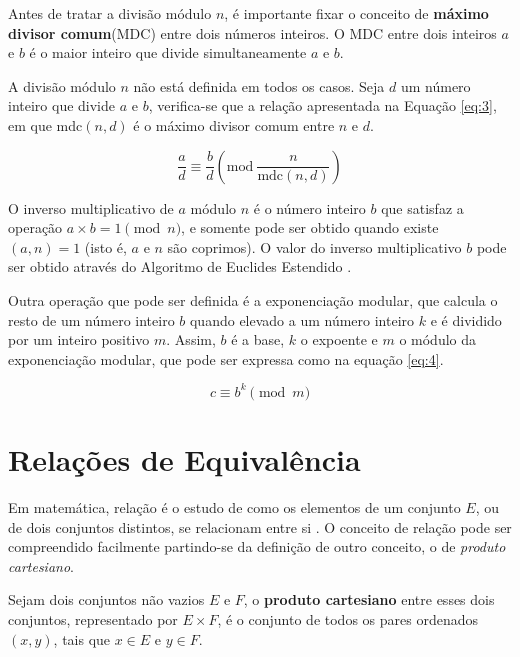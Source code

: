Antes de tratar a divisão módulo \(n\), é importante fixar o conceito de \textbf{máximo divisor comum}(MDC) entre dois números inteiros. O MDC entre dois inteiros \(a\) e \(b\) 
é o maior inteiro que divide simultaneamente \(a\) e \(b\).

A divisão módulo $n$ não está definida em todos os casos. Seja \(d\) um número inteiro que divide \(a\) e \(b\), verifica-se que a relação apresentada na Equação \ref{eq:3}, em que mdc\((n, d)\) é o máximo divisor comum entre \(n\) e \(d\).

\begin{equation}
  \frac{a}{d} \equiv \frac{b}{d}\left(\mbox{mod}\ \frac{n}{\text{mdc}(n,d)}\right) \label{eq:3}
\end{equation}

O inverso multiplicativo de $a$ módulo \(n\) é o número inteiro \(b\) que satisfaz a operação \(a \times b = 1 \pmod  n\), e somente pode ser obtido quando existe \((a, n) = 1\) (isto é, \(a\) e \(n\) são coprimos). O valor do inverso multiplicativo \(b\) pode ser obtido através do Algoritmo de Euclides Estendido \cite{Halim:2013}.

\par Outra operação que pode ser definida é a exponenciação modular, que calcula o resto de um número inteiro \(b\) quando elevado a um número inteiro \(k\) e é dividido por um inteiro positivo \(m\). Assim, $b$ é a base, $k$ o expoente e $m$ o módulo da exponenciação modular, que pode ser expressa como na equação \ref{eq:4}.

\begin{equation}
  c \equiv b^k\pmod m \label{eq:4}
\end{equation}


%
%
\section{Relações de Equivalência}
\label{relacoes_equivalencia}

Em matemática, relação é o estudo de como os elementos de um conjunto $E$, ou de dois conjuntos distintos, se relacionam entre si \cite{Domingues:2003}. O conceito de relação pode ser compreendido facilmente partindo-se da definição de outro conceito, o de \textit{produto cartesiano}.

Sejam dois conjuntos não vazios \(E\) e \(F\), o \textbf{produto cartesiano} entre esses dois conjuntos, representado por \(E \times F\), é o conjunto de todos os pares ordenados \((x, y)\), tais que \(x \in E\) e \(y \in F\).

